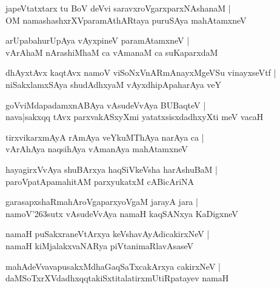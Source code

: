 \documentclass[twoside,12pt,openright]{book}
\def\S{\char'263}
\newcounter{shloka}[chapter]
\begin{document}
\begin{shloka}%
japeVtatxtarx tu BoV deVvi saravxroVgarxparxNAshanaM |\\
OM namashashxrXVparamAthARtaya puruSAya mahAtamxneV 
\end{shloka}

\begin{shloka}%
arUpabahurUpAya vAyxpineV paramAtamxneV |\\
vArAhaM nArashiMhaM ca vAmanaM ca suKaparxdaM 
\end{shloka}

\begin{shloka}%
dhAyxtAvx kaqtAvx namoV viSoNxVnARmAnayxMgeVSu vinayxseVtf |\\
niSakxlamxSAya shudAdhxyaM vAyxdhipApaharAya veY 
\end{shloka}

\begin{shloka}%
goVviMdapadamxnABAya vAsudeVvAya BUBaqteV |\\
nava|sakxqq tAvx parxvakASxyXmi yatatxsisxdadhxyXti meV vacaH 
\end{shloka}

\begin{shloka}%
tirxvikarxmAyA rAmAya veYkuMThAya narAya ca |\\
vArAhAya naqsihAya vAmanAya mahAtamxneV 
\end{shloka}

\begin{shloka}%
hayagirxVvAya shuBArxya haqSiVkeVsha harAshuBaM |\\
paroVpatApamahitAM parxyukatxM cABicAriNA 
\end{shloka}

\begin{shloka}%
garasapxshaRmahAroVgaparxyoVgaM jarayA jara |\\
namoV\S sutx vAsudeVvAya namaH kaqSANxya KaDigxneV 
\end{shloka}

\begin{shloka}%
namaH puSakxraneVtArxya keVshavAyAdicakirxNeV |\\
namaH kiMjalakxvaNARya piVtanimaRlavAsaseV 
\end{shloka}

\begin{shloka}%
mahAdeVvavapusakxMdhaGaqSaTxcakArxya cakirxNeV |\\
daMSoTxrXVdadhxqqtakiSxtitalatirxmUtiRpatayev namaH 
\end{shloka}
\end{document}
